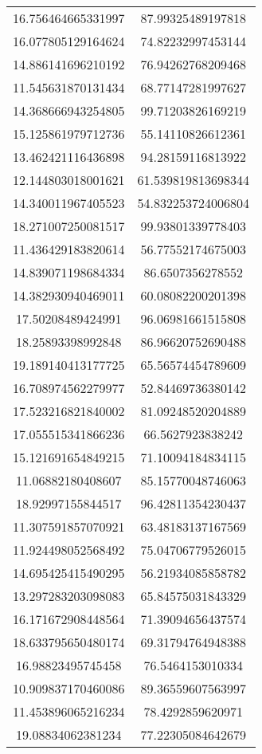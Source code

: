 \begin{table}
\begin{tabular}{cc}
16.756464665331997 & 87.99325489197818 \\
16.077805129164624 & 74.82232997453144 \\
14.886141696210192 & 76.94262768209468 \\
11.545631870131434 & 68.77147281997627 \\
14.368666943254805 & 99.71203826169219 \\
15.125861979712736 & 55.14110826612361 \\
13.462421116436898 & 94.28159116813922 \\
12.144803018001621 & 61.539819813698344 \\
14.340011967405523 & 54.832253724006804 \\
18.271007250081517 & 99.93801339778403 \\
11.436429183820614 & 56.77552174675003 \\
14.839071198684334 & 86.6507356278552 \\
14.382930940469011 & 60.08082200201398 \\
17.50208489424991 & 96.06981661515808 \\
18.25893398992848 & 86.96620752690488 \\
19.189140413177725 & 65.56574454789609 \\
16.708974562279977 & 52.84469736380142 \\
17.523216821840002 & 81.09248520204889 \\
17.055515341866236 & 66.5627923838242 \\
15.121691654849215 & 71.10094184834115 \\
11.06882180408607 & 85.15770048746063 \\
18.92997155844517 & 96.42811354230437 \\
11.307591857070921 & 63.48183137167569 \\
11.924498052568492 & 75.04706779526015 \\
14.695425415490295 & 56.21934085858782 \\
13.297283203098083 & 65.84575031843329 \\
16.171672908448564 & 71.39094656437574 \\
18.633795650480174 & 69.31794764948388 \\
16.98823495745458 & 76.5464153010334 \\
10.909837170460086 & 89.36559607563997 \\
11.453896065216234 & 78.4292859620971 \\
19.08834062381234 & 77.22305084642679 \\

\end{tabular}
\end{table}
